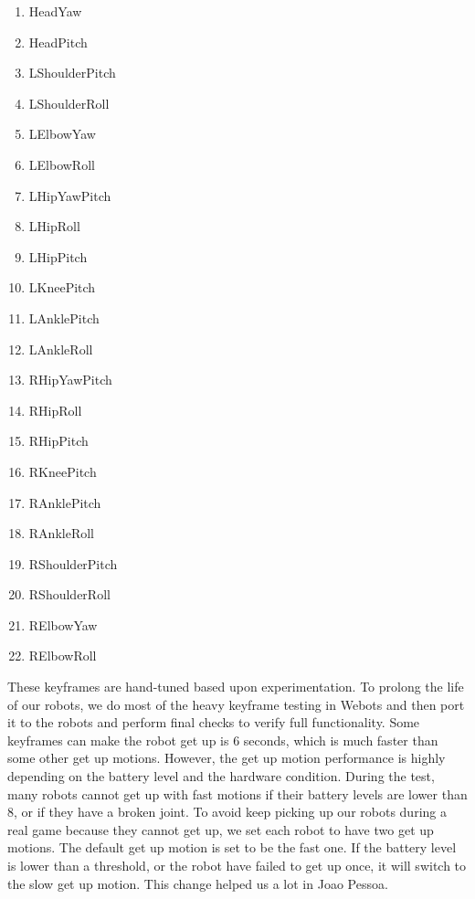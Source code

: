 \documentclass{article}
\begin{document}
	\begin{multicols}{3}
		\begin{enumerate}
			\item HeadYaw
  			\item HeadPitch
	  		\item LShoulderPitch
		  	\item LShoulderRoll
			\item LElbowYaw
  			\item LElbowRoll
	  		\item LHipYawPitch
		  	\item LHipRoll
			\item LHipPitch
  			\item LKneePitch
	  		\item LAnklePitch
		  	\item LAnkleRoll
			\item RHipYawPitch
  			\item RHipRoll
	  		\item RHipPitch
		  	\item RKneePitch
			\item RAnklePitch
  			\item RAnkleRoll
	  		\item RShoulderPitch
		  	\item RShoulderRoll
			\item RElbowYaw
  			\item RElbowRoll
		\end{enumerate}
	\end{multicols}

	These keyframes are hand-tuned based upon experimentation. To prolong the life of our robots, we do most of the heavy keyframe testing in Webots and then port it to the robots and perform final checks to verify full functionality. Some keyframes can make the robot get up is 6 seconds, which is much faster than some other get up motions. However, the get up motion performance is highly depending on the battery level and the hardware condition. During the test, many robots cannot get up with fast motions if their battery levels are lower than 8, or if they have a broken joint. To avoid keep picking up our robots during a real game because they cannot get up, we set each robot to have two get up motions. The default get up motion is set to be the fast one. If the battery level is lower than a threshold, or the robot have failed to get up once, it will switch to the slow get up motion. This change helped us a lot in Joao Pessoa. 
\end{document}
